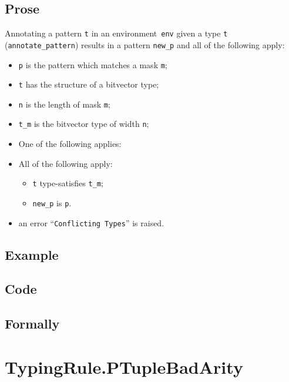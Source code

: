 \documentclass{book}
\begin{document}
  \subsection{Prose}
   Annotating a pattern \texttt{t} in an environment~\texttt{env} given a type \texttt{t} (\texttt{annotate\_pattern}) results in a pattern \texttt{new\_p} and all of the following apply:
   \begin{itemize}
   \item \texttt{p} is the pattern which matches a mask \texttt{m};
   \item \texttt{t} has the structure of a bitvector type;
   \item \texttt{n} is the length of mask \texttt{m};
   \item \texttt{t\_m} is the bitvector type of width \texttt{n};
   \item One of the following applies:
     \item All of the following apply:
       \begin{itemize}
       \item \texttt{t} type-satisfies \texttt{t\_m};
       \item \texttt{new\_p} is \texttt{p}.
       \end{itemize}
     \item an error ``\texttt{Conflicting Types}'' is raised.
   \end{itemize}

  \subsection{Example}

  \subsection{Code}

\begin{emptyformal}
    \subsection{Formally}
\end{emptyformal}


\section{TypingRule.PTupleBadArity \label{sec:TypingRule.PTupleBadArity}}
\end{document}
